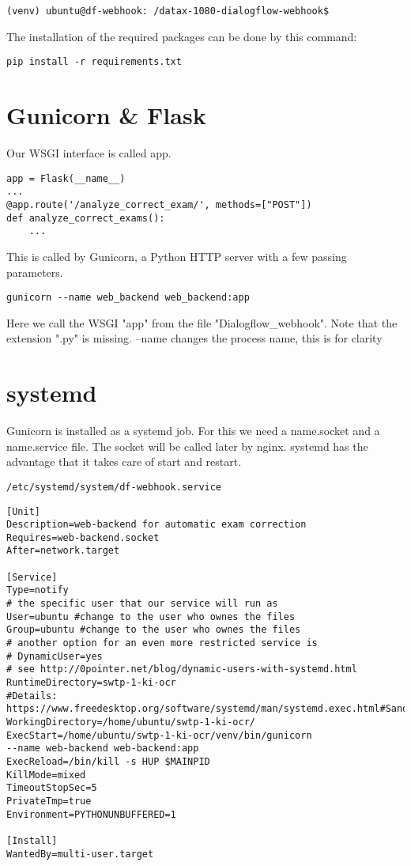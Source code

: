 \texttt{(venv) ubuntu@df-webhook:~/datax-1080-dialogflow-webhook\$}

The installation of the required packages can be done by this command:

\texttt{pip install -r requirements.txt}

\section{Gunicorn \& Flask}

Our WSGI interface is called app.

\begin{verbatim}
app = Flask(__name__)
...
@app.route('/analyze_correct_exam/', methods=["POST"])
def analyze_correct_exams():
	...
\end{verbatim}

This is called by Gunicorn, a Python HTTP server with a few passing parameters.

\begin{verbatim}
gunicorn --name web_backend web_backend:app
\end{verbatim}

Here we call the WSGI "app" from the file "Dialogflow\_webhook".
Note that the extension ".py" is missing.
--name changes the process name, this is for clarity

\section{systemd}
Gunicorn is installed as a systemd job.
For this we need a name.socket and a name.service file.
The socket will be called later by nginx.
systemd has the advantage that it takes care of start and restart.

\texttt{/etc/systemd/system/df-webhook.service}
\begin{verbatim}
[Unit]
Description=web-backend for automatic exam correction
Requires=web-backend.socket
After=network.target

[Service]
Type=notify
# the specific user that our service will run as
User=ubuntu #change to the user who ownes the files
Group=ubuntu #change to the user who ownes the files
# another option for an even more restricted service is
# DynamicUser=yes
# see http://0pointer.net/blog/dynamic-users-with-systemd.html
RuntimeDirectory=swtp-1-ki-ocr
#Details: https://www.freedesktop.org/software/systemd/man/systemd.exec.html#Sandboxing
WorkingDirectory=/home/ubuntu/swtp-1-ki-ocr/
ExecStart=/home/ubuntu/swtp-1-ki-ocr/venv/bin/gunicorn
--name web-backend web-backend:app
ExecReload=/bin/kill -s HUP $MAINPID
KillMode=mixed
TimeoutStopSec=5
PrivateTmp=true
Environment=PYTHONUNBUFFERED=1

[Install]
WantedBy=multi-user.target
\end{verbatim}

